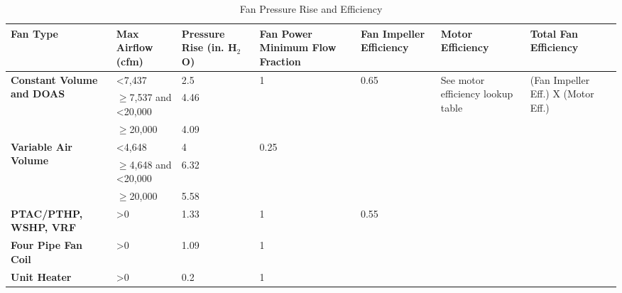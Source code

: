 \begin{table}[h!]
\centering
\small
\caption{Fan Pressure Rise and Efficiency}
\label{tab:fan_power}
\begin{tabular}{|p{1.8cm}|p{1.8cm}|p{1.8cm}|p{1.8cm}|p{1.8cm}|p{1.8cm}|p{1.8cm}|}
\hline
\textbf{Fan Type} &
  \textbf{Max Airflow (cfm)} &
  \textbf{Pressure Rise (in. H$_2$O)} &
  \textbf{Fan Power Minimum Flow Fraction} &
  \textbf{Fan Impeller Efficiency} &
  \textbf{Motor Efficiency} &
  \textbf{Total Fan Efficiency} \\ \hline
\multirow{3}{*}{\parbox{1.8cm}{\textbf{Constant Volume and DOAS}}} &
  \textless 7,437 &
  2.5 &
  \multirow{3}{*}{1} &
  \multirow{6}{*}{0.65} &
  \multirow{9}{*}{\parbox{1.4cm}{See motor efficiency lookup table}} &
  \multirow{9}{*}{\parbox{1.4cm}{(Fan Impeller Eff.) X (Motor Eff.)}} \\ \cline{2-3}
                                                & $\ge$7,537 and \textless{}20,000 & 4.46 &                       &                       &  &  \\ \cline{2-3}
                                                & $\ge$20,000                      & 4.09 &                       &                       &  &  \\ \cline{1-4}
\multirow{3}{*}{\parbox{1.4cm}{\textbf{Variable   Air Volume}}} & \textless 4,648                            & 4    & \multirow{3}{*}{0.25} &                       &  &  \\ \cline{2-3}
                                                & $\ge$4,648 and \textless 20,000  & 6.32 &                       &                       &  &  \\ \cline{2-3}
                                                & $\ge$20,000                     & 5.58 &                       &                       &  &  \\ \cline{1-5}
\textbf{PTAC/PTHP, WSHP, VRF}                   & \textgreater{}0                            & 1.33 & 1                     & \multirow{3}{*}{0.55} &  &  \\ \cline{1-4}
\textbf{Four Pipe Fan   Coil}                   & \textgreater{}0                            & 1.09 & 1                     &                       &  &  \\ \cline{1-4}
\textbf{Unit Heater}                            & \textgreater{}0                            & 0.2  & 1                     &                       &  &  \\ \hline
\end{tabular}
\end{table}
